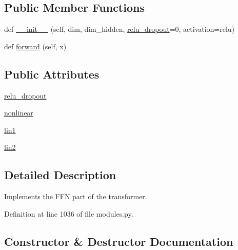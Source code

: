 \subsection*{Public Member Functions}
\begin{DoxyCompactItemize}
\item 
def \hyperlink{classparlai_1_1agents_1_1transformer_1_1modules_1_1TransformerFFN_a89cffa1831968953cdd7dfdfa7867944}{\+\_\+\+\_\+init\+\_\+\+\_\+} (self, dim, dim\+\_\+hidden, \hyperlink{classparlai_1_1agents_1_1transformer_1_1modules_1_1TransformerFFN_a22f7891e6b991a8ee6b58f08c12cf4ae}{relu\+\_\+dropout}=0, activation=\textquotesingle{}relu\textquotesingle{})
\item 
def \hyperlink{classparlai_1_1agents_1_1transformer_1_1modules_1_1TransformerFFN_a54f8d1ec7c0c4228f78a3be843ab3003}{forward} (self, x)
\end{DoxyCompactItemize}
\subsection*{Public Attributes}
\begin{DoxyCompactItemize}
\item 
\hyperlink{classparlai_1_1agents_1_1transformer_1_1modules_1_1TransformerFFN_a22f7891e6b991a8ee6b58f08c12cf4ae}{relu\+\_\+dropout}
\item 
\hyperlink{classparlai_1_1agents_1_1transformer_1_1modules_1_1TransformerFFN_a234566d2ffaffe67f04c4592cfc84265}{nonlinear}
\item 
\hyperlink{classparlai_1_1agents_1_1transformer_1_1modules_1_1TransformerFFN_addc959c81b7c0ba87a47415af7f07e16}{lin1}
\item 
\hyperlink{classparlai_1_1agents_1_1transformer_1_1modules_1_1TransformerFFN_ae0ee11939e782034e2d9809f18ed4708}{lin2}
\end{DoxyCompactItemize}


\subsection{Detailed Description}
\begin{DoxyVerb}Implements the FFN part of the transformer.
\end{DoxyVerb}
 

Definition at line 1036 of file modules.\+py.



\subsection{Constructor \& Destructor Documentation}
\mbox{\label{classparlai_1_1agents_1_1transformer_1_1modules_1_1TransformerFFN_a89cffa1831968953cdd7dfdfa7867944}} 

